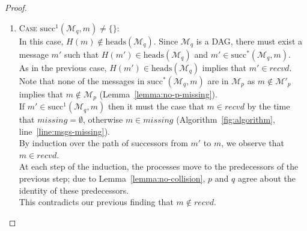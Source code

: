 \documentclass[a4paper,anonymous,USenglish]{lipics-v2019}
\begin{document}
\begin{proof}
\begin{enumerate}
    \item\textsc{Case} $\mathrm{succ}^1(\mathcal{M}_q, m) \ne \{\}$:\\
    In this case, $H(m) \notin \mathrm{heads}(\mathcal{M}_q)$.
    Since $\mathcal{M}_q$ is a DAG, there must exist a message $m'$ such that $H(m') \in \mathrm{heads}(\mathcal{M}_q)$ and $m' \in \mathrm{succ}^*(\mathcal{M}_q, m)$.\\
    As in the previous case, $H(m') \in \mathrm{heads}(\mathcal{M}_q)$ implies that $m' \in \mathit{recvd}$.\\
    Note that none of the messages in $\mathrm{succ}^*(\mathcal{M}_q, m)$ are in $\mathcal{M}_p$ as $m \notin \mathcal{M}'_p$ implies that  $m \notin \mathcal{M}_p$ (Lemma~\ref{lemma:no-p-missing}).\\
    If $m' \in \mathrm{succ}^1(\mathcal{M}_q, m)$ then it must the case that $m \in \mathit{recvd}$ by the time that $\mathit{missing} = \emptyset$, otherwise $m \in \mathit{missing}$ (Algorithm~\ref{fig:algorithm}, line~\ref{line:msgs-missing}).\\
    By induction over the path of successors from $m'$ to $m$, we observe that $m \in \mathit{recvd}$.\\
    At each step of the induction, the processes move to the predecessors of the previous step; due to Lemma~\ref{lemma:no-collision}, $p$ and $q$ agree about the identity of these predecessors.\\
    This contradicts our previous finding that $m \notin \mathit{recvd}$.
\end{enumerate}
\end{proof}
\end{document}
